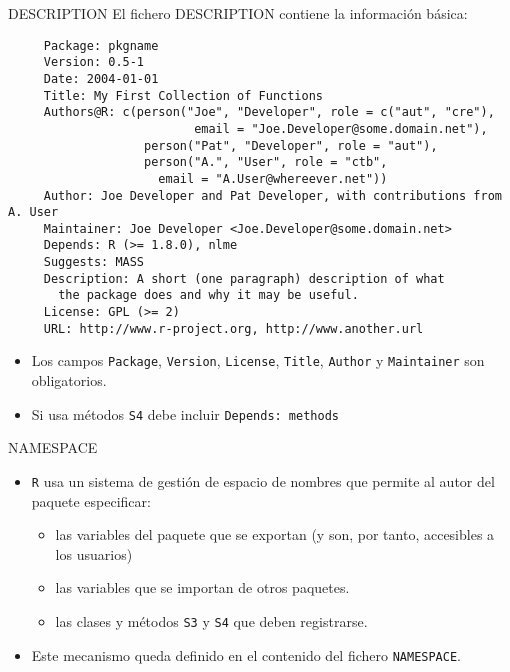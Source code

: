 \documentclass[xcolor={usenames,svgnames,dvipsnames}]{beamer}
\begin{document}
\begin{frame}[label={sec:org85fb295},fragile]{DESCRIPTION}
 El fichero DESCRIPTION contiene la información básica:
\begin{verbatim}
     Package: pkgname
     Version: 0.5-1
     Date: 2004-01-01
     Title: My First Collection of Functions
     Authors@R: c(person("Joe", "Developer", role = c("aut", "cre"),
                          email = "Joe.Developer@some.domain.net"),
                   person("Pat", "Developer", role = "aut"),
                   person("A.", "User", role = "ctb",
     	             email = "A.User@whereever.net"))
     Author: Joe Developer and Pat Developer, with contributions from A. User
     Maintainer: Joe Developer <Joe.Developer@some.domain.net>
     Depends: R (>= 1.8.0), nlme
     Suggests: MASS
     Description: A short (one paragraph) description of what
       the package does and why it may be useful.
     License: GPL (>= 2)
     URL: http://www.r-project.org, http://www.another.url
\end{verbatim}
\begin{itemize}
\item Los campos \texttt{Package}, \texttt{Version}, \texttt{License}, \texttt{Title}, \texttt{Author} y
\texttt{Maintainer} son obligatorios.
\item Si usa métodos \texttt{S4} debe incluir \texttt{Depends: methods}
\end{itemize}
\end{frame}
\begin{frame}[label={sec:org211bc43},fragile]{NAMESPACE}
 \begin{itemize}
\item \texttt{R} usa un sistema de gestión de \alert{espacio de nombres} que
permite al autor del paquete especificar:
\begin{itemize}
\item las \alert{variables} del paquete que se \alert{exportan} (y son, por tanto,
accesibles a los usuarios)
\item las \alert{variables} que se \alert{importan} de otros paquetes.
\item las \alert{clases y métodos} \texttt{S3} y \texttt{S4} que deben registrarse.
\end{itemize}
\item Este mecanismo queda definido en el contenido del fichero
\texttt{NAMESPACE}.
\end{itemize}
\end{frame}
\end{document}
